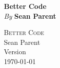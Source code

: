 

\thispagestyle{empty}

\vspace*{80pt}

\begin{raggedleft}
\fontsize{24pt}{24pt}\selectfont
\textbf{Better Code}\\
\ifdefined{}
\fi
\vspace*{1cm}
\fontsize{16pt}{18pt}\selectfont \textit{By } \textbf{Sean Parent}\\
\vspace{1cm}

\end{raggedleft}


\newpage

\vspace*{0.3\textheight}
\thispagestyle{empty}

\begin{small}
\begin{center}

\textsc{Better Code}\\

\vspace{1.0em}
\noindent
Sean Parent\\

\vspace{1.26em}
\noindent
Version \texttt{\OPTversion}\\\today


\vspace{1.6em}
\noindent

\end{center}
\end{small}